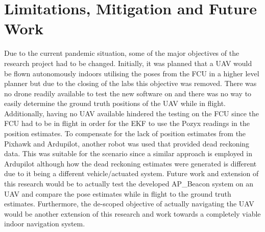 \section{Limitations, Mitigation and Future Work}\label{sec:limitations,-mitigations-and-future-work}
Due to the current pandemic situation, some of the major objectives of the research project had to be changed.
Initially, it was planned that a UAV would be flown autonomously indoors utilising the poses from the FCU in a higher level planner but due to the closing of the labs this objective was removed.
There was no drone readily available to test the new software on and there was no way to easily determine the ground truth positions of the UAV while in flight.
Additionally, having no UAV available hindered the testing on the FCU since the FCU had to be in flight in order for the EKF to use the Pozyx readings in the position estimates.
To compensate for the lack of position estimates from the Pixhawk and Ardupilot, another robot was used that provided dead reckoning data.
This was suitable for the scenario since a similar approach is employed in Ardupilot although how the dead reckoning estimates were generated is different due to it being a different vehicle/actuated system.
Future work and extension of this research would be to actually test the developed AP\_Beacon system on an UAV and compare the pose estimates while in flight to the ground truth estimates.
Furthermore, the de-scoped objective of actually navigating the UAV would be another extension of this research and work towards a completely viable indoor navigation system.
